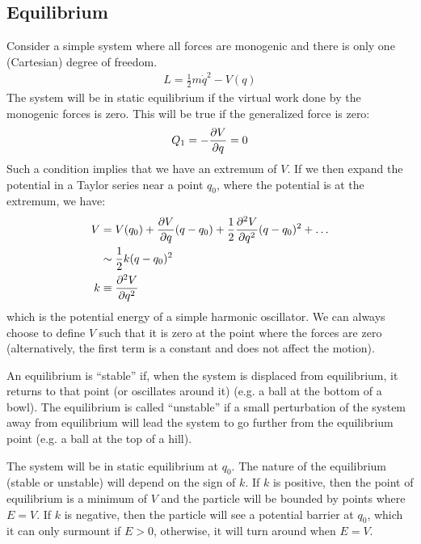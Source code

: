 \subsection{Equilibrium}
Consider a simple system where all forces are monogenic and there is only one (Cartesian) degree of freedom.
\begin{align}
L=\frac{1}{2}m\dot q^2-V(q)
\end{align}
The system will be in static equilibrium if the virtual work done by the monogenic forces is zero. This will be true if the generalized force is zero:
\begin{align}
Q_1=-\frac{\partial V}{\partial q}=0 
\end{align}
Such a condition implies that we have an extremum of $V$. If we then expand the potential in a Taylor series near a point $q_0$, where the potential is at the extremum, we have:
 \begin{align}
 V &= V(q_0)+\frac{\partial V}{\partial q}(q-q_0)+\frac{1}{2}\frac{\partial^2V}{\partial q^2}(q-q_0)^2+\dots\nonumber\\
 &\sim \frac{1}{2}k(q-q_0)^2\nonumber\\
 k&\equiv \frac{\partial^2V}{\partial q^2}
 \end{align}
which is the potential energy of a simple harmonic oscillator. We can always choose to define $V$ such that it is zero at the point where the forces are zero (alternatively, the first term is a constant and does not affect the motion).

An equilibrium is ``stable'' if, when the system is displaced from equilibrium, it returns to that point (or oscillates around it) (e.g. a ball at the bottom of a bowl). The equilibrium is called ``unstable'' if a small perturbation of the system away from equilibrium will lead the system to go further from the equilibrium point (e.g. a ball at the top of a hill).

The system will be in static equilibrium at $q_0$. The nature of the equilibrium (stable or unstable) will depend on the sign of $k$. If $k$ is positive, then the point of  equilibrium is a minimum of $V$ and the particle will be bounded by points where $E=V$. If $k$ is negative, then the particle will see a potential barrier at $q_0$, which it can only surmount if $E>0$, otherwise, it will turn around when $E=V$.

